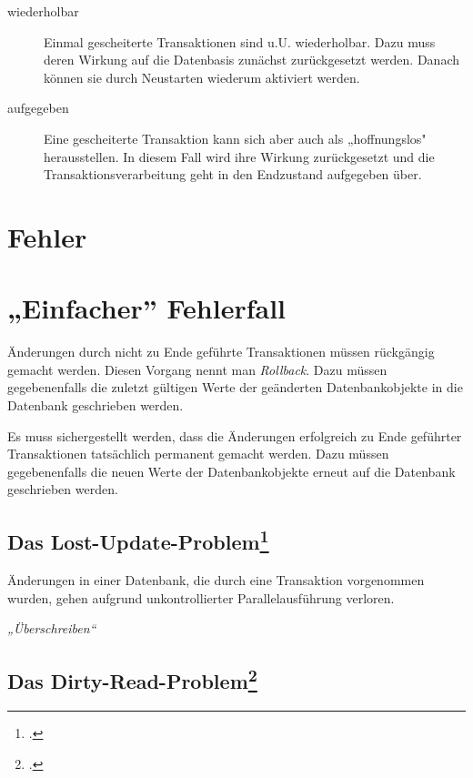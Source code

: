 \documentclass{lehramt-informatik-haupt}
\begin{document}
\begin{description}
\item[wiederholbar]

Einmal gescheiterte Transaktionen sind u.U. wiederholbar. Dazu muss
deren Wirkung auf die Datenbasis zunächst zurückgesetzt werden. Danach
können sie durch Neustarten wiederum aktiviert werden.

\item[aufgegeben]

Eine gescheiterte Transaktion kann sich aber auch als „hoffnungslos"
herausstellen. In diesem Fall wird ihre Wirkung zurückgesetzt und die
Transaktionsverarbeitung geht in den Endzustand aufgegeben über.
\end{description}

%

\section{Fehler}

\section{„Einfacher” Fehlerfall}

Änderungen durch nicht zu Ende geführte Transaktionen müssen rückgängig
gemacht werden. Diesen Vorgang nennt man \emph{Rollback}. Dazu müssen
gegebenenfalls die zuletzt gültigen Werte der geänderten
Datenbankobjekte in die Datenbank geschrieben werden.

Es muss sichergestellt werden, dass die Änderungen erfolgreich zu Ende
geführter Transaktionen tatsächlich permanent gemacht werden. Dazu
müssen gegebenenfalls die neuen Werte der Datenbankobjekte erneut auf
die Datenbank geschrieben werden.

%

\subsection{Das Lost-Update-Problem\footcite{wiki:verlorenes-update}}

Änderungen in einer Datenbank, die durch eine Transaktion vorgenommen
wurden, gehen aufgrund unkontrollierter Parallelausführung verloren.

\emph{„Überschreiben“}

%

\subsection{Das Dirty-Read-Problem\footcite{wiki:schreib-lese-konflikt}}
\end{document}
